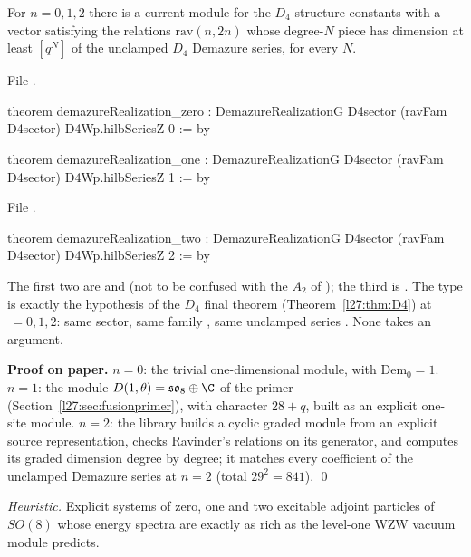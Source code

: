 \begin{theorem}[Input R for $D_4$ at $n=0,1,2$]\label{l27:thm:d4Rsmall}
For $n=0,1,2$ there is a current module for the $D_4$ structure constants with a vector satisfying the relations
$\mathrm{rav}(n,2n)$ whose degree-$N$ piece has dimension at least $[q^N]$ of the unclamped $D_4$ Demazure series, for every $N$.
\end{theorem}
\noindent File .
\begin{leancode}
theorem demazureRealization_zero :
    DemazureRealizationG D4sector (ravFam D4sector) D4Wp.hilbSeriesZ 0 := by
\end{leancode}
\begin{leancode}
theorem demazureRealization_one :
    DemazureRealizationG D4sector (ravFam D4sector) D4Wp.hilbSeriesZ 1 := by
\end{leancode}
\noindent File .
\begin{leancode}
theorem demazureRealization_two :
    DemazureRealizationG D4sector (ravFam D4sector) D4Wp.hilbSeriesZ 2 := by
\end{leancode}

\begin{dictionary}
The first two are  and  (not to be confused with the $A_2$
 of ); the third is
. The type is exactly the hypothesis  of the $D_4$ final theorem
(Theorem~\ref{l27:thm:D4}) at $\,=0,1,2$: same sector, same family , same unclamped series
. None takes an argument.
\end{dictionary}

\textbf{Proof on paper.} $n=0$: the trivial one-dimensional module, with $\mathrm{Dem}_0=1$. $n=1$: the module $D(1,\theta)=
\mathfrak{so}_8\oplus\C$ of the primer (Section~\ref{l27:sec:fusionprimer}), with character $28+q$, built as an explicit one-site
module. $n=2$: the library builds a cyclic graded module from an explicit source representation, checks Ravinder's relations on its
generator, and computes its graded dimension degree by degree; it matches every coefficient of the unclamped Demazure series at
$n=2$ (total $29^2=841$). \qed

\begin{physics}
\emph{Heuristic.} Explicit systems of zero, one and two excitable adjoint particles of $SO(8)$ whose energy spectra are exactly as rich
as the level-one WZW vacuum module predicts.
\end{physics}


